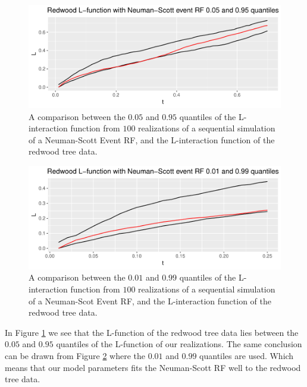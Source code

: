 \begin{figure}
    \centering
    \includegraphics[scale=0.8]{figures/ns_quant1.pdf}
    \caption{A comparison between the $0.05$ and $0.95$ quantiles of the L-interaction function from $100$ realizations of a sequential simulation of a Neuman-Scott Event RF, and the L-interaction function of the redwood tree data.}
    \label{fig:ns_quant1}
\end{figure}

\begin{figure}
    \centering
    \includegraphics[scale=0.8]{figures/ns_quant2.pdf}
    \caption{A comparison between the $0.01$ and $0.99$ quantiles of the L-interaction function from $100$ realizations of a sequential simulation of a Neuman-Scot Event RF, and the L-interaction function of the redwood tree data.}
    \label{fig:ns_quant2}
\end{figure}

In Figure \ref{fig:ns_quant1} we see that the L-function of the redwood tree data lies between the $0.05$ and $0.95$ quantiles of the L-function of our realizations. The same conclusion can be drawn from Figure \ref{fig:ns_quant2} where the $0.01$ and $0.99$ quantiles are used. Which means that our model parameters fits the Neuman-Scott RF well to the redwood tree data. 
